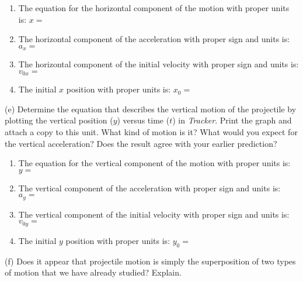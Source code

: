 \begin{enumerate}
\item The equation for the horizontal component of the motion with proper units is:
$x =$\vspace{5mm}

\item The horizontal component of the acceleration with proper sign and units is:
\( a_{x}= \) \vspace{5mm}

\item The horizontal component of the initial velocity with proper sign and units
is: \( v_{0x}= \)\vspace{5mm}

\item The initial $x$ position with proper units is: \( x_{0}= \)\vspace{5mm}

\end{enumerate}
(e) Determine the equation that describes the vertical motion of the projectile
by plotting the vertical position ($y$) versus time ($t$) in \textit{Tracker}. 
Print the graph and attach a copy to this unit. 
What kind of motion is it? What would you expect for the vertical acceleration? Does the result agree with your earlier prediction?
\vspace{8mm}

\begin{enumerate}
\item The equation for the vertical component of the motion with proper units is:
$y =$\vspace{5mm}

\item The vertical component of the acceleration with proper sign and units is: 
\( a_{y}= \)
\vspace{5mm}

\item The vertical component of the initial velocity with proper sign and units is:
\( v_{0y}= \) \vspace{5mm}

\item The initial $y$ position with proper units is: \( y_{0} =\) \vspace{5mm}

\end{enumerate}
(f) Does it appear that projectile motion is simply the superposition of two
types of motion that we have already studied? Explain.
\vspace{20mm}

